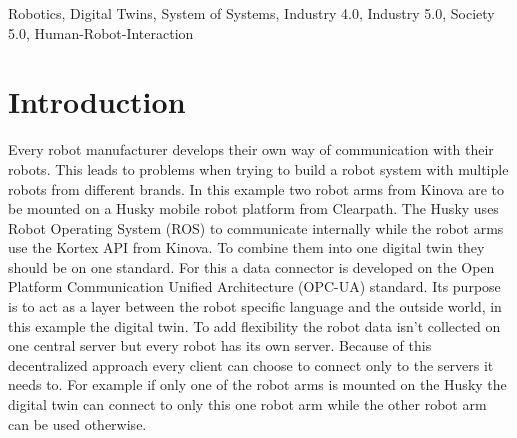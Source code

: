 \documentclass[conference]{IEEEtran}
\begin{document}
\begin{IEEEkeywords}
Robotics, Digital Twins, System of Systems, Industry 4.0, Industry 5.0, Society 5.0, Human-Robot-Interaction
\end{IEEEkeywords}

\section{Introduction}
Every robot manufacturer develops their own way of communication with their robots.
This leads to problems when trying to build a robot system with multiple robots from different brands.
In this example two robot arms from Kinova are to be mounted on a Husky mobile robot platform from Clearpath.
The Husky uses Robot Operating System (ROS) to communicate internally while the robot arms use the Kortex API from Kinova.
To combine them into one digital twin they should be on one standard.
For this a data connector is developed on the Open Platform Communication Unified Architecture (OPC-UA) standard.
Its purpose is to act as a layer between the robot specific language and the outside world, in this example the digital twin.
To add flexibility the robot data isn't collected on one central server but every robot has its own server.
Because of this decentralized approach every client can choose to connect only to the servers it needs to.
For example if only one of the robot arms is mounted on the Husky the digital twin can connect to only this one robot arm while the other robot arm can be used otherwise.
\end{document}
